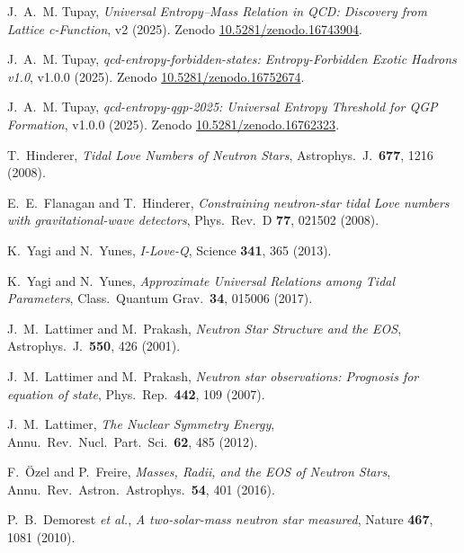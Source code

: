 \documentclass[11pt]{article}
\begin{document}
\begin{thebibliography}{99}\setlength{\itemsep}{0.2em}

J.~A.~M. Tupay, \emph{Universal Entropy–Mass Relation in QCD: Discovery from Lattice c-Function}, v2 (2025).
Zenodo \href{https://doi.org/10.5281/zenodo.16743904}{10.5281/zenodo.16743904}.

J.~A.~M. Tupay, \emph{qcd-entropy-forbidden-states: Entropy-Forbidden Exotic Hadrons v1.0}, v1.0.0 (2025).
Zenodo \href{https://doi.org/10.5281/zenodo.16752674}{10.5281/zenodo.16752674}.

J.~A.~M. Tupay, \emph{qcd-entropy-qgp-2025: Universal Entropy Threshold for QGP Formation}, v1.0.0 (2025).
Zenodo \href{https://doi.org/10.5281/zenodo.16762323}{10.5281/zenodo.16762323}.

T.~Hinderer, \emph{Tidal Love Numbers of Neutron Stars}, Astrophys.\ J.\ \textbf{677}, 1216 (2008).

E.~E.~Flanagan and T.~Hinderer, \emph{Constraining neutron-star tidal Love numbers with gravitational-wave detectors}, Phys.\ Rev.\ D \textbf{77}, 021502 (2008).

K.~Yagi and N.~Yunes, \emph{I-Love-Q}, Science \textbf{341}, 365 (2013).

K.~Yagi and N.~Yunes, \emph{Approximate Universal Relations among Tidal Parameters}, Class.\ Quantum Grav.\ \textbf{34}, 015006 (2017).

J.~M.~Lattimer and M.~Prakash, \emph{Neutron Star Structure and the EOS}, Astrophys.\ J.\ \textbf{550}, 426 (2001).

J.~M.~Lattimer and M.~Prakash, \emph{Neutron star observations: Prognosis for equation of state}, Phys.\ Rep.\ \textbf{442}, 109 (2007).

J.~M.~Lattimer, \emph{The Nuclear Symmetry Energy}, Annu.\ Rev.\ Nucl.\ Part.\ Sci.\ \textbf{62}, 485 (2012).

F.~\"Ozel and P.~Freire, \emph{Masses, Radii, and the EOS of Neutron Stars}, Annu.\ Rev.\ Astron.\ Astrophys.\ \textbf{54}, 401 (2016).

P.~B.~Demorest \emph{et al.}, \emph{A two-solar-mass neutron star measured}, Nature \textbf{467}, 1081 (2010).


\end{thebibliography}
\end{document}
